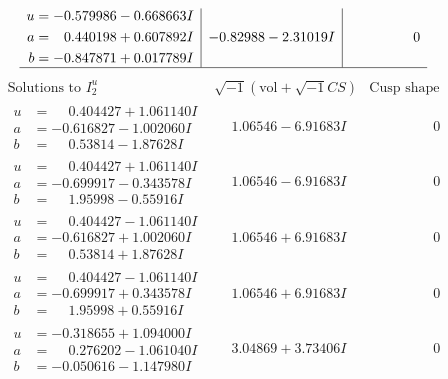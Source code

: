 \documentclass[1p]{elsarticle_modified}
\theoremstyle{definition}
\newcommand{\I}{\sqrt{-1}}
\begin{document}
$$\begin{array}{c|c|c}
\begin{aligned}
u &= -0.579986 - 0.668663 I \\
a &= \phantom{-}0.440198 + 0.607892 I \\
b &= -0.847871 + 0.017789 I\end{aligned}
 & -0.82988 - 2.31019 I & \phantom{-0.000000 } 0\\
 \hline 
 \end{array}$$\newpage$$\begin{array}{c|c|c}  
\text{Solutions to }I^u_{2}& \I (\text{vol} + \sqrt{-1}CS) & \text{Cusp shape}\\
 \hline 
\begin{aligned}
u &= \phantom{-}0.404427 + 1.061140 I \\
a &= -0.616827 - 1.002060 I \\
b &= \phantom{-}0.53814 - 1.87628 I\end{aligned}
 & \phantom{-}1.06546 - 6.91683 I & \phantom{-0.000000 } 0 \\ \hline\begin{aligned}
u &= \phantom{-}0.404427 + 1.061140 I \\
a &= -0.699917 - 0.343578 I \\
b &= \phantom{-}1.95998 - 0.55916 I\end{aligned}
 & \phantom{-}1.06546 - 6.91683 I & \phantom{-0.000000 } 0 \\ \hline\begin{aligned}
u &= \phantom{-}0.404427 - 1.061140 I \\
a &= -0.616827 + 1.002060 I \\
b &= \phantom{-}0.53814 + 1.87628 I\end{aligned}
 & \phantom{-}1.06546 + 6.91683 I & \phantom{-0.000000 } 0 \\ \hline\begin{aligned}
u &= \phantom{-}0.404427 - 1.061140 I \\
a &= -0.699917 + 0.343578 I \\
b &= \phantom{-}1.95998 + 0.55916 I\end{aligned}
 & \phantom{-}1.06546 + 6.91683 I & \phantom{-0.000000 } 0 \\ \hline\begin{aligned}
u &= -0.318655 + 1.094000 I \\
a &= \phantom{-}0.276202 - 1.061040 I \\
b &= -0.050616 - 1.147980 I\end{aligned}
 & \phantom{-}3.04869 + 3.73406 I & \phantom{-0.000000 } 0 \\ \hline\begin{aligned}

\end{aligned}
\end{array}$$
\end{document}
